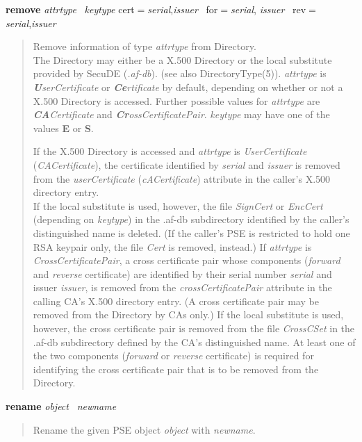 {\bf remove} {\em attrtype}~ {\em keytype} cert$=${\em serial},{\em issuer}~ for$=${\em serial},{\em 
issuer}~ rev$=${\em serial},{\em issuer}
\begin{quote}
Remove information of type {\em attrtype} from Directory. \\
The Directory may either be a X.500 Directory or the local substitute provided by 
SecuDE ({\em .af-db}). (see also DirectoryType(5)).
{\em attrtype} is {\em {\bf U}serCertificate} or {\em {\bf Ce}rtificate} by default, depending on whether
or not a X.500 Directory is accessed. Further possible values for {\em attrtype} are
{\em {\bf CA}Certificate} and {\em {\bf Cr}ossCertificatePair}.
{\em keytype} may have one of the values {\bf E} or {\bf S}.
 
If the X.500 Directory is accessed and {\em attrtype} is {\em UserCertificate} ({\em CACertificate}), the certificate identified by 
{\em serial} and {\em issuer} is removed from the {\em userCertificate} ({\em cACertificate}) attribute in the caller's X.500 directory entry. \\
If the local substitute is used, however, the file {\em SignCert} or {\em EncCert} 
(depending on {\em keytype}) 
in the .af-db subdirectory identified by the caller's distinguished name is deleted.
(If the caller's PSE is restricted to hold one RSA keypair only, the file {\em Cert} is
removed, instead.)
If {\em attrtype} is {\em CrossCertificatePair}, a cross certificate pair whose components ({\em forward}
and {\em reverse} certificate) are identified by their serial number {\em serial} and issuer
{\em issuer}, is removed from the {\em crossCertificatePair} attribute in the calling CA's 
X.500 directory entry. (A cross certificate pair may be removed from the Directory by CAs only.)
If the local substitute is used, however, the cross certificate pair is removed from the file {\em CrossCSet}
in the .af-db subdirectory defined by the CA's distinguished name.
At least one of the two components ({\em forward} or {\em reverse} certificate) is required for identifying 
the cross certificate pair that is to be removed from the Directory.
\end{quote}

{\bf rename} {\em object}~ {\em newname}
\begin{quote}
Rename the given PSE object {\em object} with {\em newname}. 
\end{quote}

